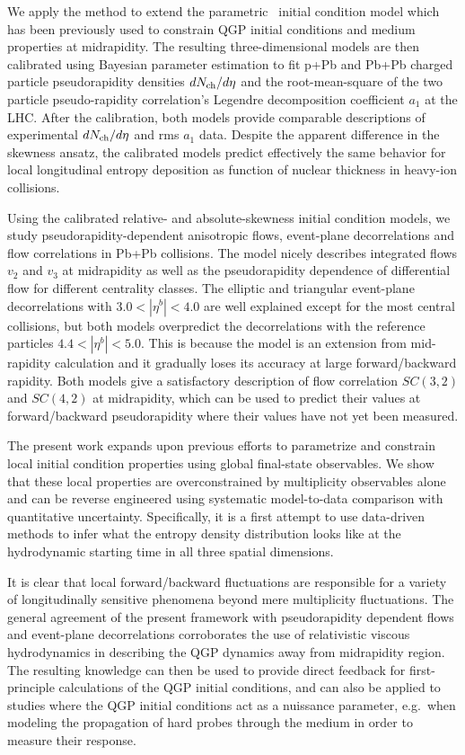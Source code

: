 We apply the method to extend the parametric \trento\ initial condition model which has been previously used to constrain QGP initial conditions and medium properties at midrapidity. 
The resulting three-dimensional models are then calibrated using Bayesian parameter estimation to fit p+Pb and Pb+Pb charged particle pseudorapidity densities $dN_\text{ch}/d\eta$ and the root-mean-square of the two particle pseudo-rapidity correlation's Legendre decomposition coefficient $a_1$ at the LHC.
After the calibration, both models provide comparable descriptions of experimental $dN_\text{ch}/d\eta$ and rms $a_1$ data.
Despite the apparent difference in the skewness ansatz, the calibrated models predict effectively the same behavior for local longitudinal entropy deposition as function of nuclear thickness in heavy-ion collisions.

Using the calibrated relative- and absolute-skewness initial condition models, we study pseudorapidity-dependent anisotropic flows, event-plane decorrelations and flow correlations in Pb+Pb collisions.
The model nicely describes integrated flows $v_2$ and $v_3$ at midrapidity as well as the pseudorapidity dependence of differential flow for different centrality classes.
The elliptic and triangular event-plane decorrelations with $3.0 < |\eta^b| < 4.0$ are well explained except for the most central collisions, but both models overpredict the decorrelations with the reference particles $4.4 < |\eta^b| < 5.0$.
This is because the model is an extension from mid-rapidity calculation and it gradually loses its accuracy at large forward/backward rapidity.
Both models give a satisfactory description of flow correlation $SC(3,2)$ and $SC(4,2)$ at midrapidity, which can be used to predict their values at forward/backward pseudorapidity where their values have not yet been measured.

The present work expands upon previous efforts to parametrize and constrain local initial condition properties using global final-state observables.
We show that these local properties are overconstrained by multiplicity observables alone and can be reverse engineered using systematic model-to-data comparison with quantitative uncertainty.
Specifically, it is a first attempt to use data-driven methods to infer what the entropy density distribution looks like at the hydrodynamic starting time in all three spatial dimensions.

It is clear that local forward/backward fluctuations are responsible for a variety of longitudinally sensitive phenomena beyond mere multiplicity fluctuations.
The general agreement of the present framework with pseudorapidity dependent flows and event-plane decorrelations corroborates the use of relativistic viscous hydrodynamics in describing the QGP dynamics away from midrapidity region.
The resulting knowledge can then be used to provide direct feedback for first-principle calculations of the QGP initial conditions, and can also be applied to studies where the QGP initial conditions act as a nuissance parameter, e.g.\ when modeling the propagation of hard probes through the medium in order to measure their response.

